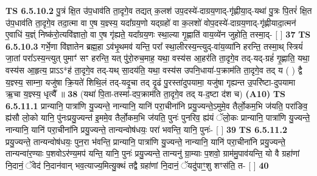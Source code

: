 \documentclass[17pt]{extarticle}
\begin{document}
                  \newline
                                \textbf{ TS 6.5.10.2} \newline
                  पु॒त्रं क्षि॒त उ॑प॒धाव॑ति ता॒दृगे॒व तद्यत् क॒लश॑ उप॒दस्ये॑-दाग्रय॒णाद्-गृ॑ह्णीया॒द्-यथा॑ पु॒त्रः पि॒तरं॑ क्षि॒त उ॑प॒धाव॑ति ता॒दृगे॒व तदा॒त्मा वा ए॒ष य॒ज्ञ्स्य॒ यदा᳚ग्रय॒णो यद्ग्रहो॑ वा क॒लशो॑ वोप॒दस्ये॑-दाग्रय॒णाद्-गृ॑ह्णीयादा॒त्मन॑ ए॒वाधि॑ य॒ज्ञ्ं निष्क॑रो॒त्यवि॑ज्ञातो॒ वा ए॒ष गृ॑ह्यते॒ यदा᳚ग्रय॒णः स्था॒ल्या गृ॒ह्णाति॑ वाय॒व्ये॑न जुहोति॒ तस्मा॒द्- [  ] \textbf{  37} \newline
                  \newline
                                \textbf{ TS 6.5.10.3} \newline
                  गर्भे॒णा वि॑ज्ञातेन ब्रह्म॒हा ऽव॑भृ॒थमव॑ यन्ति॒ परा᳚ स्था॒लीरस्य॒न्त्युद्-वा॑य॒व्या॑नि हरन्ति॒ तस्मा॒थ् स्त्रियं॑ जा॒तां परा᳚ऽस्य॒न्त्युत् पुमाꣳ॑ सꣳ हरन्ति॒ यत् पु॑रो॒रुच॒माह॒ यथा॒ वस्य॑स आ॒हर॑ति ता॒दृगे॒व तद्-यद्-ग्रहं॑ गृ॒ह्णाति॒ यथा॒ वस्य॑स आ॒हृत्य॒ प्राऽऽ*ह॑ ता॒दृगे॒व तद्-यथ् सा॒दय॑ति॒ यथा॒ वस्य॑स उपनि॒धाया॑-प॒क्राम॑ति ता॒दृगे॒व तद् य ( ) द्वै य॒ज्ञ्स्य॒ साम्ना॒ यजु॑षा क्रि॒यते॑ शिथि॒लं तद्-यदृ॒चा तद् दृ॒ढं पु॒रस्ता॑दुपयामा॒ यजु॑षा गृह्यन्त उ॒परि॑ष्टा-दुपयामा ऋ॒चा य॒ज्ञ्स्य॒ धृत्यै᳚ ॥ \textbf{  38 } \newline
                  \newline
                      (यथा॑ पि॒ता-तस्मा॑-दप॒क्राम॑ति ता॒दृगे॒व तद् य-द॒ष्टा द॑श च)  \textbf{(A10)} \newline \newline
                                        \textbf{ TS 6.5.11.1} \newline
                  प्रान्यानि॒ पात्रा॑णि यु॒ज्यन्ते॒ नान्यानि॒ यानि॑ परा॒चीना॑नि प्रयु॒ज्यन्ते॒ऽमुमे॒व तैर्लो॒कम॒भि ज॑यति॒ परा॑ङिव॒ ह्य॑सौ लो॒को यानि॒ पु॑नःप्रयु॒ज्यन्त॑ इ॒ममे॒व तैर्लो॒कम॒भि ज॑यति॒ पुनः॑ पुनरिव॒ ह्य॑यं ॅलो॒कः प्रान्यानि॒ पात्रा॑णि यु॒ज्यन्ते॒ नान्यानि॒ यानि॑ परा॒चीना॑नि प्रयु॒ज्यन्ते॒ तान्यन्वोष॑धयः॒ परा॑ भवन्ति॒ यानि॒ पुनः॑- [  ] \textbf{  39} \newline
                  \newline
                                \textbf{ TS 6.5.11.2} \newline
                  प्रयु॒ज्यन्ते॒ तान्यन्वोष॑धयः॒ पुन॒रा भ॑वन्ति॒ प्रान्यानि॒ पात्रा॑णि यु॒ज्यन्ते॒ नान्यानि॒ यानि॑ परा॒चीना॑नि प्रयु॒ज्यन्ते॒ तान्यन्वा॑र॒ण्याः प॒शवोऽर॑ण्य॒मप॑ यन्ति॒ यानि॒ पुनः॑ प्रयु॒ज्यन्ते॒ तान्यनु॑ ग्रा॒म्याः प॒शवो॒ ग्राम॑मु॒पाव॑यन्ति॒ यो वै ग्रहा॑णां नि॒दानं॒ ॅवेद॑ नि॒दान॑वान् भव॒त्याज्य॒मित्यु॒क्थं तद्वै ग्रहा॑णां नि॒दानं॒ ॅयदु॑पाꣳ॒॒शु शꣳस॑ति॒ त- [  ] \textbf{  40} \newline
\end{document}
